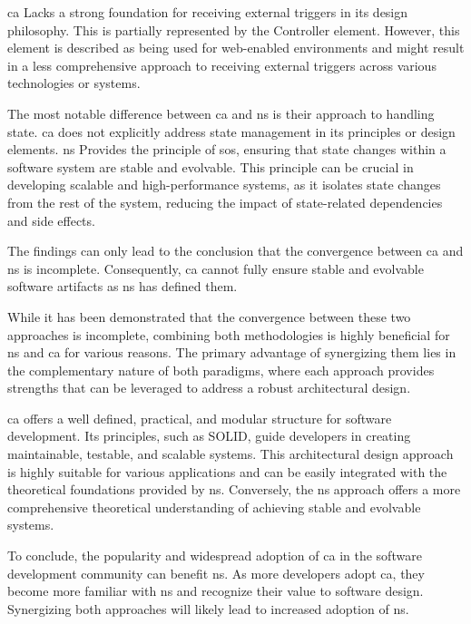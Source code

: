 \gls{ca} Lacks a strong foundation for receiving external triggers in its design
philosophy. This is partially represented by the Controller element. However, this element
is described as being used for web-enabled environments and might result in a less
comprehensive approach to receiving external triggers across various technologies or
systems.

The most notable difference between \gls{ca} and \gls{ns} is their approach to handling
state. \gls{ca} does not explicitly address state management in its principles or design
elements. \gls{ns} Provides the principle of \gls{sos}, ensuring that state changes within
a software system are stable and evolvable. This principle can be crucial in developing
scalable and high-performance systems, as it isolates state changes from the rest of the
system, reducing the impact of state-related dependencies and side effects. 

The findings can only lead to the conclusion that the convergence between \gls{ca} and
\gls{ns} is incomplete.  Consequently, \gls{ca} cannot fully ensure stable and evolvable
software artifacts as \gls{ns} has defined them.

While it has been demonstrated that the convergence between these two approaches is
incomplete, combining both methodologies is highly beneficial for \gls{ns} and \gls{ca}
for various reasons. The primary advantage of synergizing them lies in the complementary
nature of both paradigms, where each approach provides strengths that can be leveraged to
address a robust architectural design. 

\gls{ca} offers a well defined, practical, and modular structure for software development.
Its principles, such as SOLID, guide developers in creating maintainable, testable, and
scalable systems. This architectural design approach is highly suitable for various
applications and can be easily integrated with the theoretical foundations provided by
\gls{ns}. Conversely, the \gls{ns} approach offers a more comprehensive theoretical
understanding of achieving stable and evolvable systems. 

To conclude, the popularity and widespread adoption of \gls{ca} in the software
development community can benefit \gls{ns}. As more developers adopt \gls{ca}, they become
more familiar with \gls{ns} and recognize their value to software design. Synergizing both
approaches will likely lead to increased adoption of \gls{ns}.